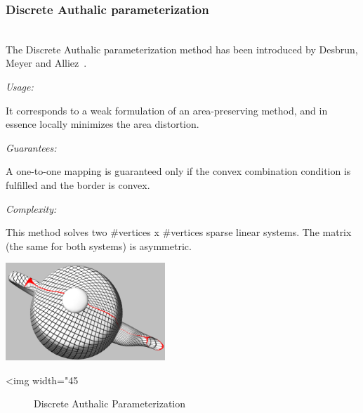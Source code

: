 \subsubsection{Discrete Authalic parameterization}

  \\

The Discrete Authalic parameterization method has been introduced by
Desbrun, Meyer and Alliez~\cite{cgal:dma-ipsm-02}.

\emph{Usage:}

It corresponds to
a weak formulation of an area-preserving method, and in essence
locally minimizes the area distortion.

\emph{Guarantees:}

A one-to-one mapping is
guaranteed only if the convex combination condition is fulfilled and
the border is convex.

\emph{Complexity:}

 This method solves two
\#vertices x \#vertices sparse linear systems. The matrix (the same
for both systems) is asymmetric.

\begin{center}
    \label{Surface_mesh_parameterization-fig-authalic}
    \begin{ccTexOnly}
        \includegraphics[width=0.45\textwidth]{Surface_mesh_parameterization/authalic}
    \end{ccTexOnly}
    \begin{ccHtmlOnly}
        <img width="45%
    \end{ccHtmlOnly}
    \begin{figure}[h]
        \caption{Discrete Authalic Parameterization}
    \end{figure}
\end{center}

